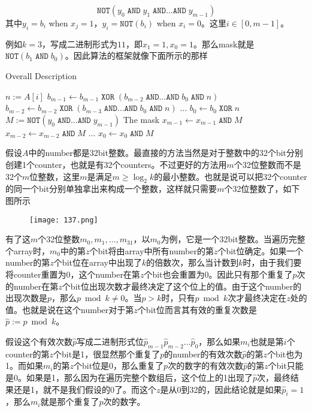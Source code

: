 \[
\texttt{NOT}(y_0\;\texttt{AND}\;y_1\;\texttt{AND}\ldots\texttt{AND}\;y_{m-1})
\]
其中$y_i=b_i$ when $x_j=1$，$y_i=\texttt{NOT}(b_i)$ when $x_i=0$。这里$i\in[0,m-1]$。
\par
例如$k=3$，写成二进制形式为$11$，即$x_{1}=1,x_0=1$。那么mask就是$\texttt{NOT}(b_1\;\texttt{AND}\;b_0)$。因此算法的框架就像下面所示的那样
\setcounter{algorithm}{0}
\begin{algorithm}[H]
\caption{Overall Description}
\begin{algorithmic}[1]
\State $n:=A[i]$
\State $b_{m-1}\gets b_{m-1}\;\texttt{XOR}\;(b_{m-2}\;\texttt{AND}\ldots\texttt{AND}\;b_0\;\texttt{AND}\;n)$
\State $b_{m-2}\gets b_{m-2}\;\texttt{XOR}\;(b_{m-3}\;\texttt{AND}\ldots\texttt{AND}\;b_0\;\texttt{AND}\;n)$
\State $\ldots$
\State $b_{0}\gets b_{0}\;\texttt{XOR}\;n$
\State $M:=\texttt{NOT}(y_0\;\texttt{AND}\ldots\texttt{AND}\;y_{m-1})$ \Comment The mask
\State $x_{m-1}\gets x_{m-1}\;\texttt{AND}\;M$
\State $x_{m-2}\gets x_{m-2}\;\texttt{AND}\;M$
\State $\ldots$
\State $x_{0}\gets x_{0}\;\texttt{AND}\;M$
\EndFor
\EndProcedure
\end{algorithmic}
\end{algorithm}
假设$A$中的number都是32bit整数。最直接的方法当然是对于整数中的32个bit分别创建1个counter，也就是有32个counters。不过更好的方法用$m$个32位整数而不是32个$m$位整数，这里$m$是满足$m\geq\log_2{k}$的最小整数。也就是说可以把32个counter的同一个bit分别单独拿出来构成一个整数，这样就只需要$m$个32位整数了，如下图所示
\begin{figure}[H]
\texttt{[image: 137.png]}
\end{figure}
有了这$m$个32位整数$m_0, m_1,\ldots, m_{31}$，以$m_0$为例，它是一个32bit整数。当遍历完整个array时，$m_0$中的第$z$个bit将由array中所有number的第$z$个bit位确定。如果一个number的第$z$个bit位在array中出现了$k$的倍数次，那么当计数到$k$时，由于我们要将counter重置为0，这个number在第$z$个bit也会重置为0。因此只有那个重复了$p$次的number在第$z$个bit位出现次数才最终决定了这个位上的值。由于这个number的出现次数是$p$，那么$p\bmod k\neq0$。当$p>k$时，只有$p\bmod k$次才最终决定在$z$处的值。也就是说在这个number对于第$z$个bit位而言其有效的重复次数是$\hat{p}:=p\bmod k$。
\par
假设这个有效次数$\hat{p}$写成二进制形式位$\hat{p}_{m-1}\hat{p}_{m-2}\ldots\hat{p}_0$，那么如果$m_i$也就是第$i$个counter的第$z$个bit是1，很显然那个重复了$p$的number的有效次数$\hat{p}$的第$z$个bit也为1。而如果$m_i$的第$z$个bit位是0，那么重复了$p$次的数字的有效次数$\hat{p}$的第$z$个bit只能是0。如果是1，那么因为在遍历完整个数组后，这个位上的1出现了$\hat{p}$次，最终结果还是1，就不是我们假设的0了。而这个$z$是从0到32的，因此结论就是如果$\hat{p}_i=1$，那么$m_i$就是那个重复了$p$次的数字。
